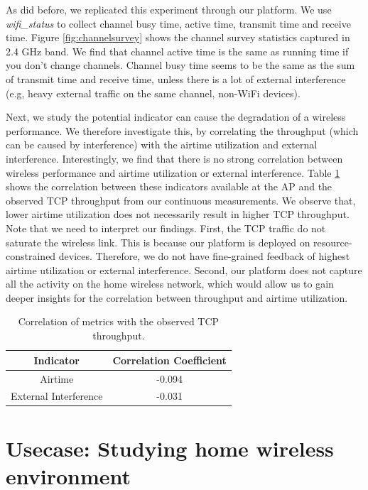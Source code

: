 As \cite{channelsurvey} did before, we replicated this experiment through our \sysname platform. We use \textit{wifi\_status} to collect channel busy time, active time, transmit time and receive time. Figure \ref{fig:channelsurvey} shows the channel survey statistics captured in 2.4 GHz band. We find that channel active time is the same as running time if you don't change channels. Channel busy time seems to be the same as the sum of transmit time and receive time, unless there is a lot of external interference (e.g, heavy external traffic on the same channel, non-WiFi devices).

Next, we study the potential indicator can cause the degradation of a wireless performance. We therefore investigate this, by correlating the throughput (which can be caused by interference) with the airtime utilization and external interference. Interestingly, we find that there is no strong correlation between wireless performance and airtime utilization or external interference. Table \ref{table: Correlation} shows the correlation between these indicators available at the AP and the observed TCP throughput from our continuous measurements. We observe that, lower airtime utilization does not necessarily result in higher TCP throughput. Note that we need to interpret our findings. First, the TCP traffic do not saturate the wireless link. This is because our platform is deployed on resource-constrained devices. Therefore, we do not have fine-grained feedback of highest airtime utilization or external interference. Second, our platform does not capture all the activity on the home wireless network, which would allow us to gain deeper insights for the correlation between throughput and airtime utilization. 

\begin{table}[]
\centering
\begin{tabular}{ |c|c| }
\hline
Indicator               & Correlation Coefficient  \\ 
\hline
Airtime               & -0.094  \\ 
\hline
External Interference & -0.031 \\ 
\hline
\end{tabular}
\caption{Correlation of metrics with the observed TCP throughput.}
\label{table: Correlation}
\end{table}

\section{Usecase: Studying home wireless environment}
\label{sec.usecase3}

